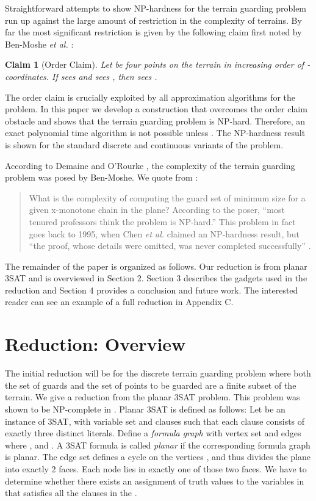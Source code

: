 \documentclass[11pt]{article}
\newtheorem{claim}[theorem]{Claim}
\begin{document}
Straightforward attempts to show NP-hardness for the terrain guarding problem run up against the large amount of restriction in the complexity of terrains.  By far the most significant restriction is given by the following claim first noted by Ben-Moshe \textit{et al.} \cite{MKM05}:

\begin{claim}[Order Claim]
Let  be four points on the terrain in increasing order of -coordinates.  If  sees  and  sees , then  sees .  
\end{claim}

The order claim is crucially exploited by all approximation algorithms for the problem.  In this paper we develop a construction that overcomes the order claim obstacle and shows that the terrain guarding problem is NP-hard.  Therefore, an exact polynomial time algorithm is not possible unless .  The NP-hardness result is shown for the standard discrete and continuous variants of the problem.  


According to Demaine and O'Rourke \cite{DO05}, the complexity of the terrain guarding problem was posed by Ben-Moshe. We quote from \cite{DO05}:
\begin{quote}
 What is the complexity of computing the guard set of minimum size for a given x-monotone chain in the plane? According to the poser, ``most tenured professors think the problem is NP-hard.'' This problem in fact goes back to 1995, when Chen \textit{et al.} \cite{CEU96} claimed an NP-hardness result, but ``the proof, whose details were omitted, was never completed successfully'' \cite{K06}.
\end{quote}

The remainder of the paper is organized as follows.  Our reduction is from planar 3SAT and is overviewed in Section 2.  Section 3 describes the gadgets used in the reduction and Section 4 provides a conclusion and future work.  The interested reader can see an example of a full reduction in Appendix C.

\section{Reduction: Overview}



The initial reduction will be for the discrete terrain guarding problem where both the set of guards and the set of points to be guarded are a finite subset of the terrain.  We give a reduction from the planar 3SAT problem.  This problem was shown to be NP-complete in \cite{L82}.  Planar 3SAT is defined as follows: Let  be an instance of 3SAT, with variable set  and clauses  such that each clause consists of exactly three distinct literals. Define a \textit{formula graph}  with vertex set  and edges  where , and
. A 3SAT formula  is called \textit{planar} if the corresponding formula graph  is planar. The edge set  defines a cycle on the vertices , and thus divides the plane into exactly 2 faces. Each node  lies in exactly one of those two faces. We have to determine whether there exists an assignment of truth values to the variables in  that satisfies all the clauses in the .
\end{document}
